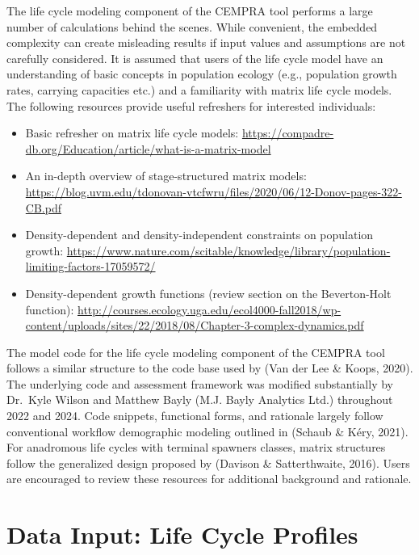 \documentclass[
  letterpaper,
  DIV=11,
  numbers=noendperiod]{scrreprt}
\providecommand{\tightlist}{%
  \setlength{\itemsep}{0pt}\setlength{\parskip}{0pt}}
\begin{document}
The life cycle modeling component of the CEMPRA tool performs a large
number of calculations behind the scenes. While convenient, the embedded
complexity can create misleading results if input values and assumptions
are not carefully considered. It is assumed that users of the life cycle
model have an understanding of basic concepts in population ecology
(e.g., population growth rates, carrying capacities etc.) and a
familiarity with matrix life cycle models. The following resources
provide useful refreshers for interested individuals:

\begin{itemize}
\tightlist
\item
  Basic refresher on matrix life cycle models:
  \url{https://compadre-db.org/Education/article/what-is-a-matrix-model}
\item
  An in-depth overview of stage-structured matrix models:
  \url{https://blog.uvm.edu/tdonovan-vtcfwru/files/2020/06/12-Donov-pages-322-CB.pdf}
\item
  Density-dependent and density-independent constraints on population
  growth:
  \url{https://www.nature.com/scitable/knowledge/library/population-limiting-factors-17059572/}
\item
  Density-dependent growth functions (review section on the
  Beverton-Holt function):
  \url{http://courses.ecology.uga.edu/ecol4000-fall2018/wp-content/uploads/sites/22/2018/08/Chapter-3-complex-dynamics.pdf}
\end{itemize}

The model code for the life cycle modeling component of the CEMPRA tool
follows a similar structure to the code base used by (Van der Lee \&
Koops, 2020). The underlying code and assessment framework was modified
substantially by Dr.~Kyle Wilson and Matthew Bayly (M.J. Bayly Analytics
Ltd.) throughout 2022 and 2024. Code snippets, functional forms, and
rationale largely follow conventional workflow demographic modeling
outlined in (Schaub \& Kéry, 2021). For anadromous life cycles with
terminal spawners classes, matrix structures follow the generalized
design proposed by (Davison \& Satterthwaite, 2016). Users are
encouraged to review these resources for additional background and
rationale.

\section{Data Input: Life Cycle
Profiles}\label{data-input-life-cycle-profiles}
\end{document}
